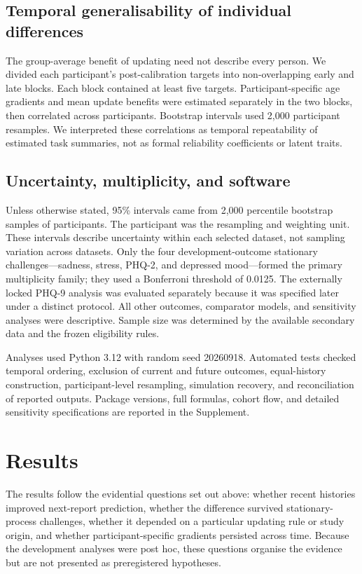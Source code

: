 \documentclass[pdflatex,sn-vancouver-num]{sn-jnl}
\begin{document}
\subsection{Temporal generalisability of individual differences}

The group-average benefit of updating need not describe every person. We divided each participant's post-calibration targets into non-overlapping early and late blocks. Each block contained at least five targets. Participant-specific age gradients and mean update benefits were estimated separately in the two blocks, then correlated across participants. Bootstrap intervals used 2,000 participant resamples. We interpreted these correlations as temporal repeatability of estimated task summaries, not as formal reliability coefficients or latent traits.

\subsection{Uncertainty, multiplicity, and software}

Unless otherwise stated, 95\% intervals came from 2,000 percentile bootstrap samples of participants. The participant was the resampling and weighting unit. These intervals describe uncertainty within each selected dataset, not sampling variation across datasets. Only the four development-outcome stationary challenges---sadness, stress, PHQ-2, and depressed mood---formed the primary multiplicity family; they used a Bonferroni threshold of 0.0125. The externally locked PHQ-9 analysis was evaluated separately because it was specified later under a distinct protocol. All other outcomes, comparator models, and sensitivity analyses were descriptive. Sample size was determined by the available secondary data and the frozen eligibility rules.

Analyses used Python 3.12 with random seed 20260918. Automated tests checked temporal ordering, exclusion of current and future outcomes, equal-history construction, participant-level resampling, simulation recovery, and reconciliation of reported outputs. Package versions, full formulas, cohort flow, and detailed sensitivity specifications are reported in the Supplement.

\section{Results}

The results follow the evidential questions set out above: whether recent histories improved next-report prediction, whether the difference survived stationary-process challenges, whether it depended on a particular updating rule or study origin, and whether participant-specific gradients persisted across time. Because the development analyses were post hoc, these questions organise the evidence but are not presented as preregistered hypotheses.
\end{document}
